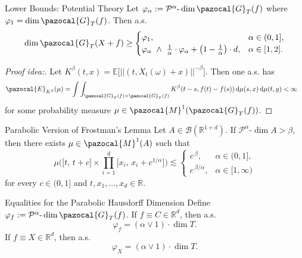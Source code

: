 \documentclass{beamer}
\theoremstyle{plain}
\theoremstyle{definition}
\theoremstyle{remark}
\newcommand{\R}{\mathbb R}
\newcommand{\Rd}{{\mathbb R^d}}
\newcommand{\1}{\mathbbm{1}}
\newcommand{\E}{{\mathbb E}}
\newcommand{\m}{\text{-}}
\newcommand{\ph}{\varphi}
\begin{document}
\begin{frame}{Lower Bounds: Potential Theory}
Let $\ph_\alpha := \mathcal{P}^\alpha\m\dim \pazocal{G}_T(f)$ where $\ph_1 = \dim \pazocal{G}_T(f)$. Then a.s.
\begin{equation*}
\dim \pazocal{G}_T(X+f) \geq
\begin{cases}
\ph_1, & \alpha \in (0,1],\\
\ph_\alpha \ \wedge \ \frac{1}{\alpha} \cdot \ph_\alpha + \big(1-\frac{1}{\alpha}\big)\cdot d, & \alpha \in [1,2].
\end{cases}
\end{equation*}
\begin{proof}[Proof idea:] Let $K^\beta(t,x) =\E \big[||(t,  X_t(\omega) + x)||^{-\beta}\big]$. Then one a.s. has
\begin{align*}
& \pazocal{E}_{K^\beta}(\mu) = \int \int_{\pazocal{G}_T(f)\times \pazocal{G}_T(f)}  K^\beta(t-s,f(t)-f(s))\, \textnormal{d}\mu (s,x)\, \textnormal{d}\mu (t,y) < \infty
\end{align*}
for some probability measure $\mu \in \pazocal{M}^1(\pazocal{G}_T(f))$.
\end{proof}
\end{frame}

\begin{frame}{Parabolic Version of Frostman's Lemma}
Let $A \in \mathcal{B}(\R^{1 + d})$. If $\mathcal{P}^{\alpha}\m\dim A > \beta,$ then there exists $\mu \in \pazocal{M}^1(A)$ such that
\begin{equation*}
\mu\Bigg(\big[t,\, t+c\big]\times \prod_{i=1}^d \Big[x_i,\, x_i+c^{1/\alpha}\Big]\Bigg) \lesssim 
\begin{cases}
c^{\, \beta}, & \alpha \in (0,1],\\
c^{\, \beta/ \alpha}, & \alpha \in [1,\infty)
\end{cases}
\end{equation*} 
for every $c \in (0,1]$ and $t,  x_1,\dots,x_d \in \R$.
\end{frame}

\begin{frame}{Equalities for the Parabolic Hausdorff Dimension}
Define $\ph_f := \mathcal{P}^\alpha\m\dim \pazocal{G}_T(f)$. If $f \equiv C \in \Rd$, then a.s.
$$\ph_f = (\alpha \vee 1) \cdot \dim T. $$
If $f \equiv X \in \Rd$, then a.s.
$$\ph_X = (\alpha \vee 1) \cdot \dim T. $$
\end{frame}
\end{document}
